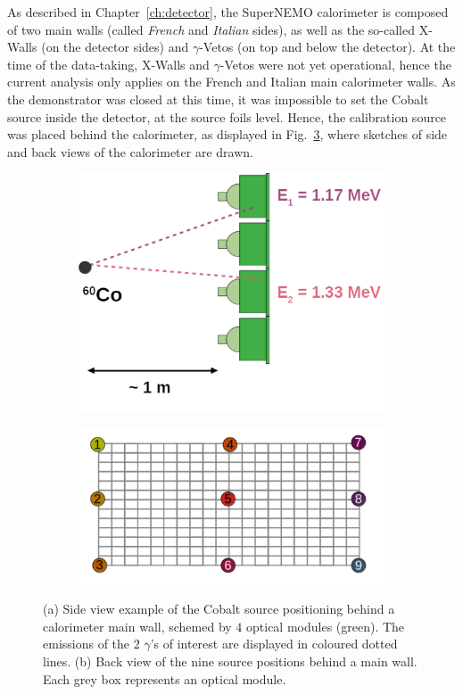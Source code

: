 As described in Chapter~\ref{ch:detector}, the SuperNEMO calorimeter is composed of two main walls (called \emph{French} and \emph{Italian} sides), as well as the so-called X-Walls (on the detector sides) and $\gamma$-Vetos (on top and below the detector).
At the time of the data-taking, X-Walls and $\gamma$-Vetos were not yet operational, hence the current analysis only applies on the French and Italian main calorimeter walls.
As the demonstrator was closed at this time, it was impossible to set the Cobalt source inside the detector, at the source foils level.
Hence, the calibration source was placed behind the calorimeter, as displayed in Fig.~\ref{fig:Co_exp_design}, where sketches of side and back views of the calorimeter are drawn.
\begin{figure}[h]
  \centering
  \begin{subfigure}[t]{0.48\textwidth}
    \centering
    \includegraphics[height=0.5\textwidth]{commissioning/fig_commissioning/Co_setup.pdf}
    \captionsetup{justification=justified}
    \caption{
      \label{subfig:Co_setup}}
  \end{subfigure}
  \hfill
  \begin{subfigure}[t]{0.48\textwidth}
    \centering
    \includegraphics[height=0.5\textwidth]{commissioning/fig_commissioning/Co_setup_wall.pdf}
    \captionsetup{justification=justified}
    \caption{
      \label{subfig:Co_setup_wall}}
  \end{subfigure}
  \caption{(a) Side view example of the Cobalt source positioning behind a calorimeter main wall, schemed by $4$ optical modules (green).
    The emissions of the $2$ $\gamma$'s of interest are displayed in coloured dotted lines.
    (b) Back view of the nine source positions behind a main wall.
    Each grey box represents an optical module.
    \label{fig:Co_exp_design}
  }
\end{figure}
